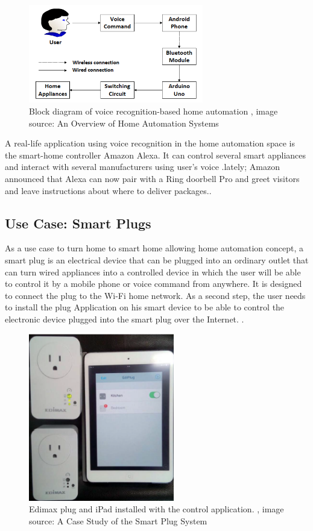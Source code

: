 \documentclass[conference]{IEEEtran}
\begin{document}
\begin{figure}[h!]
	\centering
	\includegraphics[width=3in]{voice.png}
	\caption{\label{voice}  Block diagram of voice recognition-based home automation
		, image source: An Overview of Home Automation Systems
		\cite{blutooth} }
\end{figure}

A real-life application using voice recognition in the home automation space is the smart-home controller Amazon Alexa. It can control several smart appliances and interact with several manufacturers using user's voice .lately; Amazon announced that Alexa can now pair with a Ring doorbell Pro and greet visitors and leave instructions about where to deliver packages.\cite{alexa}.


\subsection{Use Case: Smart Plugs}

As a use case to turn home to smart home allowing home automation concept, a smart plug is an electrical device that can be plugged into an ordinary outlet that can turn wired appliances into a controlled device in which the user will be able to control it by a mobile phone or voice command from anywhere. It is designed to connect the plug to the Wi-Fi home network. As a second step, the user needs to install the plug Application on his smart device to be able to control the electronic device plugged into the smart plug over the Internet. \cite{plug}. 

\begin{figure}[h!]
	\centering
	\includegraphics[width=2.5in]{plug.png}
	\caption{\label{plug}  Edimax plug and iPad installed with the control application.
		, image source: A Case Study of the Smart Plug System
		\cite{plug} }
\end{figure}
\end{document}
